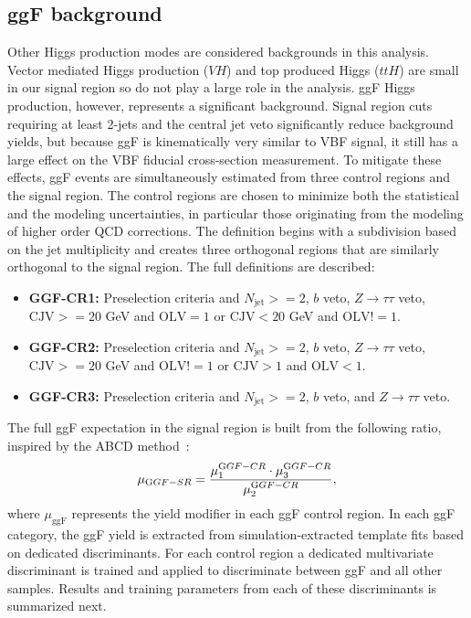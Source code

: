 \subsection{ggF background}
Other Higgs production modes are considered backgrounds in this analysis. Vector mediated Higgs production ($VH$) and top produced Higgs ($ttH$) are small in our signal region so do not play a large role in the analysis. ggF Higgs production, however, represents a significant background. Signal region cuts requiring at least 2-jets and the central jet veto significantly reduce background yields, but because ggF is kinematically very similar to VBF signal, it still has a large effect on the VBF fiducial cross-section measurement. To mitigate these effects, ggF events are simultaneously estimated from three control regions and the signal region. The control regions are chosen to minimize both the statistical and the modeling uncertainties, in particular those originating from the modeling of higher order QCD corrections. The definition begins with a subdivision based on the jet multiplicity and creates three orthogonal regions that are similarly orthogonal to the signal region. The full definitions are described:  
\begin{itemize} 
\item {\textbf{GGF-CR1:}} Preselection criteria and $N_{ \text{jet}}>=2$, $b$ veto, $Z\rightarrow\tau\tau$ veto, $\text{CJV} >= 20$ GeV and $\text{OLV} = 1$ or $\text{CJV} < 20$ GeV and $\text{OLV} != 1$. 
\item {\textbf{GGF-CR2:}} Preselection criteria and $N_{ \text{jet}}>=2$, $b$ veto, $Z\rightarrow\tau\tau$ veto, $\text{CJV}>=20$ GeV and $\text{OLV} != 1$ or $\text{CJV}>1$ and $\text{OLV}<1$.
\item {\textbf{GGF-CR3:}} Preselection criteria and $N_{ \text{jet}}>=2$, $b$ veto, and $Z\rightarrow\tau\tau$ veto. 
\end{itemize} 
The full ggF expectation in the signal region is built from the following ratio, inspired by the ABCD method~\cite{ABCD}: 
\begin{equation}
	\mu_{{\text GGF-SR}} = \frac{\mu^{{\text GGF-CR}}_{1} \cdot\mu^{{\text GGF-CR}}_{3}}{ \mu^{{\text GGF-CR}}_{2}},
\end{equation}
where $\mu_{\text{ggF}}$ represents the yield modifier in each ggF control region. In each ggF category, the ggF yield is extracted from simulation-extracted template fits based on dedicated discriminants. For each control region a dedicated multivariate discriminant is trained and applied to discriminate between ggF and all other samples. Results and training parameters from each of these discriminants is summarized next.

